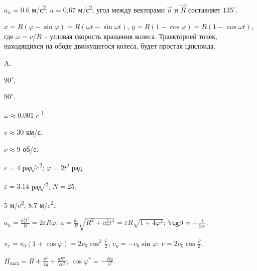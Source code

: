 \begin{Answer}{39}
$a_n = 0.6$ м/с\textsuperscript{2}; $a = 0.67$ м/с\textsuperscript{2}; угол между векторами $\vec{a}$ и $\vec{R}$ составляет $135^{\circ}$.
\end{Answer}
\begin{Answer}{40}
$x= R(\varphi - \sin \varphi) = R(\omega t - \sin \omega t)$, $y=R(1-\cos \varphi) = R(1-\cos \omega t)$, где $\omega = v/R$ -- угловая скорость вращения колеса. Траекторией точек, находящихся на ободе движущегося колеса, будет простая циклоида.
\end{Answer}
\begin{Answer}{42}
A.
\end{Answer}
\begin{Answer}{43}
$90^{\circ}$.
\end{Answer}
\begin{Answer}{44}
$90^{\circ}$.
\end{Answer}
\begin{Answer}{45}
$\omega \approx 0.001$ c\textsuperscript{-1}.
\end{Answer}
\begin{Answer}{46}
$v \approx 30$ км/с.
\end{Answer}
\begin{Answer}{47}
$\nu \approx 9$ об/с.
\end{Answer}
\begin{Answer}{48}
$\varepsilon = 4$ рад/c\textsuperscript{2}; $\varphi = 2t^2$ рад.
\end{Answer}
\begin{Answer}{49}
$\varepsilon =  3.14$ рад/\textsuperscript{2}, $N = 25$.
\end{Answer}
\begin{Answer}{50}
5 м/c\textsuperscript{2}, 8.7 м/c\textsuperscript{2}.
\end{Answer}
\begin{Answer}{51}
$a_n = \frac{a_{\tau}^2 t^2}{R} = 2 \varepsilon R \varphi$; $a = \frac{a_{\tau}}{R} \sqrt{R^2 + a_{\tau}^2 t^4} = \varepsilon R \sqrt{1 + 4 \varphi^2}$; $\tg \beta = -\frac{1}{2\varphi}$.
\end{Answer}
\begin{Answer}{52}
$v_x = v_0 (1 + \cos \varphi) = 2v_0 \cos^2 \frac{\varphi}{2}$; $v_y = -v_0 \sin \varphi$; $v = 2v_0 \cos \frac{\varphi}{2}$.
\end{Answer}
\begin{Answer}{53}
$H_{\max} = R + \frac{v^2}{2g} + \frac{gR^2}{2v^2}$; $\cos \varphi^{*} = - \frac{Rg}{v^2}$.
\end{Answer}
